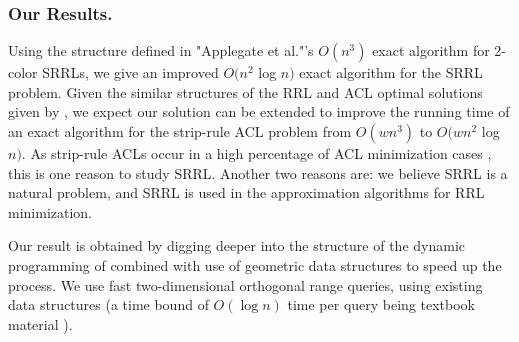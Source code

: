 \subsubsection{Our Results.}
Using the structure defined in "Applegate et al."'s \cite{ACJKLW07}
$O(n^3)$ exact algorithm for 2-color SRRLs,
we give an improved $O(n^2 $ log $n)$ exact algorithm for the SRRL problem.
Given the similar structures of the RRL and ACL optimal solutions given by
\cite{ACJKLW07}, we expect our solution can be extended to improve the
running time of an exact algorithm
for the strip-rule ACL problem from $O(wn^3)$ to  $O(w n^2$ log $n)$.
As strip-rule ACLs occur in a high percentage
of ACL minimization cases \cite{ACJKLW07}, this is one reason to study SRRL.
Another two reasons are: we believe SRRL is a natural problem, and  SRRL is used in the approximation algorithms for RRL minimization.

Our result is obtained by digging deeper into the structure of the
dynamic programming of \cite{ACJKLW07} combined with use of
geometric data structures to speed up the process.
We use fast two-dimensional orthogonal range queries,
using existing data structures  (a time bound of $O(\log n)$ time
 per query being textbook material \cite{KOS2000}).

